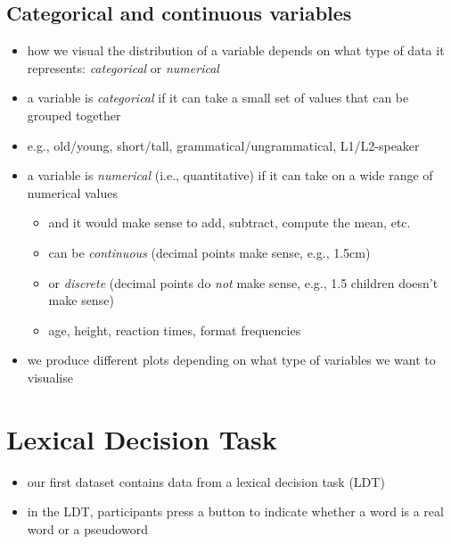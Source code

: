 \documentclass[
  letterpaper,
  DIV=11]{scrartcl}
\providecommand{\tightlist}{%
  \setlength{\itemsep}{0pt}\setlength{\parskip}{0pt}}\usepackage{longtable,booktabs,array}
\theoremstyle{definition}
\theoremstyle{remark}
\begin{document}
\hypertarget{categorical-and-continuous-variables}{%
\subsection{Categorical and continuous
variables}\label{categorical-and-continuous-variables}}

\begin{itemize}
\tightlist
\item
  how we visual the distribution of a variable depends on what type of
  data it represents: \emph{categorical} or \emph{numerical}
\item
  a variable is \emph{categorical} if it can take a small set of values
  that can be grouped together
\item
  e.g., old/young, short/tall, grammatical/ungrammatical, L1/L2-speaker
\item
  a variable is \emph{numerical} (i.e., quantitative) if it can take on
  a wide range of numerical values

  \begin{itemize}
  \tightlist
  \item
    and it would make sense to add, subtract, compute the mean, etc.
  \item
    can be \emph{continuous} (decimal points make sense, e.g., 1.5cm)
  \item
    or \emph{discrete} (decimal points do \emph{not} make sense, e.g.,
    1.5 children doesn't make sense)
  \item
    age, height, reaction times, format frequencies
  \end{itemize}
\item
  we produce different plots depending on what type of variables we want
  to visualise
\end{itemize}

\hypertarget{lexical-decision-task}{%
\section{Lexical Decision Task}\label{lexical-decision-task}}

\begin{itemize}
\item
  our first dataset contains data from a lexical decision task (LDT)
\item
  in the LDT, participants press a button to indicate whether a word is
  a real word or a pseudoword
\end{itemize}
\end{document}
